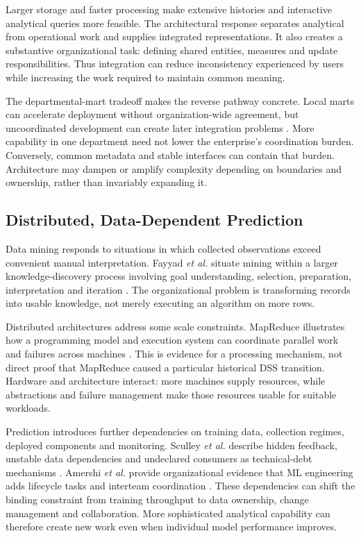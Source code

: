 \documentclass[journal]{IEEEtran}
\begin{document}
Larger storage and faster processing make extensive histories and interactive analytical queries more feasible. The architectural response separates analytical from operational work and supplies integrated representations. It also creates a substantive organizational task: defining shared entities, measures and update responsibilities. Thus integration can reduce inconsistency experienced by users while increasing the work required to maintain common meaning.

The departmental-mart tradeoff makes the reverse pathway concrete. Local marts can accelerate deployment without organization-wide agreement, but uncoordinated development can create later integration problems \cite{chaudhuri1997}. More capability in one department need not lower the enterprise's coordination burden. Conversely, common metadata and stable interfaces can contain that burden. Architecture may dampen or amplify complexity depending on boundaries and ownership, rather than invariably expanding it.

\subsection{Distributed, Data-Dependent Prediction}
Data mining responds to situations in which collected observations exceed convenient manual interpretation. Fayyad \emph{et al.} situate mining within a larger knowledge-discovery process involving goal understanding, selection, preparation, interpretation and iteration \cite{fayyad1996}. The organizational problem is transforming records into usable knowledge, not merely executing an algorithm on more rows.

Distributed architectures address some scale constraints. MapReduce illustrates how a programming model and execution system can coordinate parallel work and failures across machines \cite{Dean2004}. This is evidence for a processing mechanism, not direct proof that MapReduce caused a particular historical DSS transition. Hardware and architecture interact: more machines supply resources, while abstractions and failure management make those resources usable for suitable workloads.

Prediction introduces further dependencies on training data, collection regimes, deployed components and monitoring. Sculley \emph{et al.} describe hidden feedback, unstable data dependencies and undeclared consumers as technical-debt mechanisms \cite{sculley2015}. Amershi \emph{et al.} provide organizational evidence that ML engineering adds lifecycle tasks and interteam coordination \cite{amershi2019}. These dependencies can shift the binding constraint from training throughput to data ownership, change management and collaboration. More sophisticated analytical capability can therefore create new work even when individual model performance improves.
\end{document}
